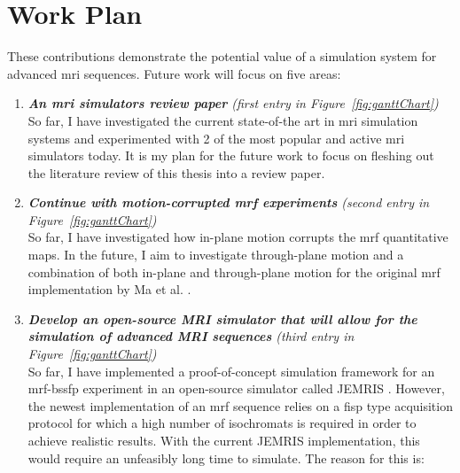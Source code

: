 \section{Work Plan}\label{chapterlabel4sec2}

These contributions demonstrate the potential value of a simulation system for advanced \ac{mri} sequences. 
Future work will focus on five areas:


\begin{enumerate}
    \item \textit{\textbf{An \ac{mri} simulators review paper} (first entry in Figure~\ref{fig:ganttChart})} \\
    So far, I have investigated the current state-of-the art in \ac{mri} simulation systems and experimented with 2 of the most popular and active \ac{mri} simulators today.
    It is my plan for the future work to focus on fleshing out the literature review of this thesis into a review paper.
    
	\item \textit{\textbf{Continue with motion-corrupted \ac{mrf} experiments} (second entry in Figure~\ref{fig:ganttChart})} \\
	So far, I have investigated how in-plane motion corrupts the \ac{mrf} quantitative maps.
	In the future, I aim to investigate through-plane motion and a combination of both in-plane and through-plane motion for the original \ac{mrf} implementation by Ma et al. \cite{Ma2013}.
	
	\item \textit{\textbf{Develop an open-source MRI simulator that will allow for the simulation of advanced MRI sequences} (third entry in Figure~\ref{fig:ganttChart})} \\
	
	So far, I have implemented a proof-of-concept simulation framework for an \ac{mrf}-\ac{bssfp} experiment in an open-source simulator called JEMRIS \cite{Stocker2010}.
	However, the newest implementation of an \ac{mrf} sequence relies on a \ac{fisp} type acquisition protocol for which a high number of isochromats is required in order to achieve realistic results.
	With the current JEMRIS implementation, this would require an unfeasibly long time to simulate.
	The reason for this is:
	

\end{enumerate}
